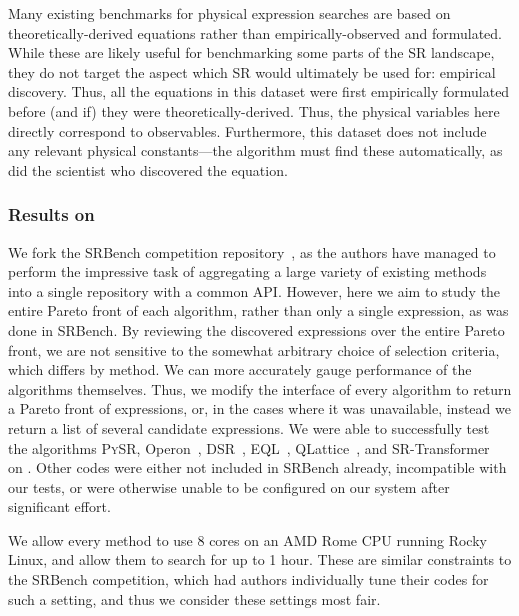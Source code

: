 \documentclass[letterpaper,twocolumn]{scrartcl}
\newcommand\pysr{\textsc{PySR}\xspace}
\begin{document}
Many existing benchmarks for physical expression searches are based on theoretically-derived equations rather than empirically-observed and formulated. 
While these are likely useful for benchmarking some parts of the SR landscape, they do not target the aspect which SR would ultimately be used for: empirical discovery.
Thus, all the equations in this dataset were first empirically formulated before (and if) they were theoretically-derived.
Thus, the physical variables here directly correspond to observables.
Furthermore, this dataset does not include any relevant physical constants---the algorithm must find these automatically, as did the scientist who discovered the equation.



\subsubsection{Results on \bench}

We fork the SRBench competition repository~\cite{defrancaInterpretableSymbolicRegression2023}, as the authors have managed to perform the impressive task of aggregating a large variety of existing methods into a single repository with a common API.
However, here we aim to study the entire Pareto front of each algorithm, rather than only a single expression, as was done in SRBench.
By reviewing the discovered expressions over the entire Pareto front, we are not sensitive to the somewhat arbitrary choice of selection criteria, which differs by method. 
We can more accurately gauge performance of the algorithms themselves.
Thus, we modify the interface of every algorithm to return a Pareto front of expressions, or, in the cases where it was unavailable, instead we return a list of several candidate expressions.
We were able to successfully test the algorithms \pysr, Operon~\cite{burlacuOperonEfficientGenetic2020}, DSR~\cite{petersenDeepSymbolicRegression2021}, EQL~\cite{sahooLearningEquationsExtrapolation2018}, QLattice~\cite{brolosApproachSymbolicRegression2021}, and SR-Transformer~\cite{kamiennyEndtoendSymbolicRegression2022} on \bench.
Other codes were either not included in SRBench already, incompatible with our tests, or were otherwise unable to be configured on our system after significant effort.

We allow every method to use 8 cores on an AMD Rome CPU running Rocky Linux, and allow them to search for up to 1 hour.
These are similar constraints to the SRBench competition, which had authors individually tune their codes for such a setting, and thus we consider these settings most fair.
\end{document}
